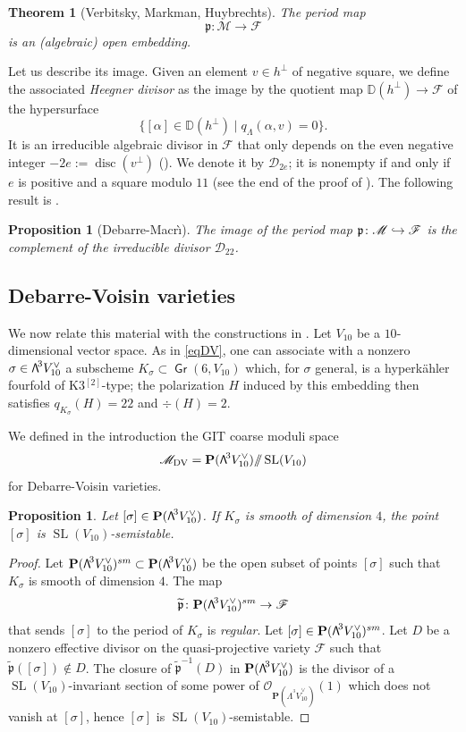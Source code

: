\documentclass[11pt]{article}
\let\mathcal\mathscr
\newcommand\hto{\mathrel{\lhook\joinrel\to}}
\newtheorem{theo}[lemm]{Theorem}
\newtheorem{prop}[lemm]{Proposition}
\theoremstyle{definition}
\renewcommand\P{{\mathbf P}}\let\PP\P
\newcommand\mD{\mathbb{D}}
\newcommand\cD{\mathcal{D}}
\newcommand\cF{\mathcal{F}}
\newcommand\cM{\mathcal{M}}
\newcommand\cO{\mathcal{O}}\let\OO\cO
\newcommand\cMDV{\cM_{\mathrm{DV}}}
\DeclareMathOperator{\Gr}{\mathsf{Gr}}
\newcommand\gp{\mathfrak p}
\let\wt\widetilde
\let\dual\vee
\DeclareMathOperator{\disc}{disc}
\DeclareMathOperator{\SL}{SL}
\newcommand\bw[1]{{\hbox{\large$\mathsf{\Lambda}$}^{\!#1}}}
\newcommand\sbw[2]{{{\mathsf{\Lambda}}^{^{\scriptscriptstyle#1}}{#2}}}
\newcommand{\gquot}{/\!\!/}
\newcommand\hk{hyperkähler\xspace}
\begin{document}
\begin{theo}[Verbitsky, Markman, Huybrechts]\label{torth}
The period map
\[
\gp\colon \cM\to \cF
\] is an (algebraic) open embedding.
\end{theo}

Let us describe its image. Given an element $v\in h^\bot$ of negative square, we define the associated \emph{Heegner divisor}
as the image by the quotient map $ \mD(h^\bot)\to\cF$ of the hypersurface
\[
\{[\alpha]\in \mD(h^\bot) \mid q_\Lambda(\alpha, v ) =0\}.
\]
It is an irreducible algebraic divisor in $\cF$ that only depends on the even
negative integer $-2e:=\disc(v^\bot)$ (\cite[Prop.\,4.1(2)(c)]{dm}). We
denote it by $\cD_{2e}$; it is nonempty if and only if $e$ is positive and a
square modulo $11$ (see the end of the proof of \cite[Prop.\,4.1]{dm}). The following result is \cite[Th.\,6.1]{dm}.

\begin{prop}[Debarre-Macr\`\i ]\label{image}
The image of the period map
$\gp\colon \cM\hto \cF
$ is the complement of the irreducible divisor $\cD_{22}$.
\end{prop}

\subsection{Debarre-Voisin varieties}

We now relate this material with the constructions in \cite{devo}. Let $V_{10}$ be a $10$-dimensional vector space. As in \eqref{eqDV}, one can associate with a nonzero
$\sigma\in \bw3V_{10}^\dual$ a subscheme $K_\sigma\subset \Gr(6,V_{10})$ which, for $\sigma$ general, is a
\hk fourfold of K3$^{[2]}$-type; the polarization $H$ induced by this embedding then satisfies $q_{K_\sigma}(H)=22$ and $\div(H)=2$.

We defined in the introduction
the GIT
coarse moduli space
\[
\cMDV=\PP(\bw3 V_{10}^\dual) \gquot \SL(V_{10})
\]
for Debarre-Voisin varieties.

\begin{prop}
Let $[\sigma]\in \PP(\bw3 V_{10}^\dual)$. If $K_{\sigma}$ is smooth of dimension $4$,
the point~$[\sigma]$ is $\SL(V_{10})$-semistable.
\end{prop}

\begin{proof}
Let $\PP(\bw3 V_{10}^\dual)^{\textnormal{sm}}\subset \PP(\bw3 V_{10}^\dual)$ be the open subset of points $[\sigma]$ such that $K_{\sigma}$ is smooth of dimension $4$. The map
\[
\wt{\gp}\colon \PP(\bw3 V_{10}^\dual)^{\textnormal{sm}}
\to \cF
\]
that sends $[\sigma]$ to the period of $K_\sigma$ is \emph{regular}.
Let $[\sigma]\in \PP(\bw3 V_{10}^\dual)^{\textnormal{sm}}$.
Let $D$ be a nonzero effective divisor on the quasi-projective variety $\cF $ such that
$\wt{\gp}([\sigma])\notin D$.
The closure of $ {\wt{\gp}^{-1}(D)}$ in $\PP(\bw3 V_{10}^\dual)$ is the divisor of a $\SL(V_{10})$-invariant section of some power of $\cO_{\P(\sbw3 V_{10}^\dual)}(1)$ which does not vanish at $[\sigma]$, hence $[\sigma]$ is $\SL(V_{10})$-semistable.
\end{proof}
\end{document}
